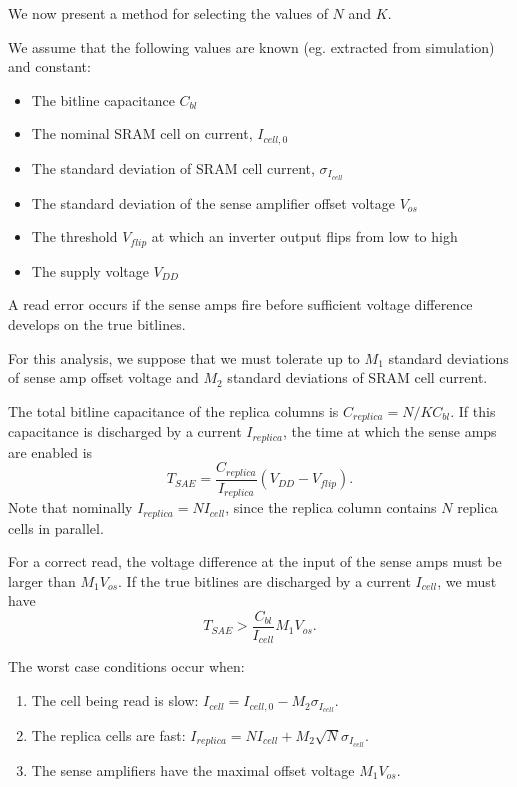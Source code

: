 We now present a method for selecting the values of $N$ and $K$.

We assume that the following values are known (eg. extracted from simulation) and constant:
\begin{itemize}
\item The bitline capacitance $C_{bl}$
\item The nominal SRAM cell on current, $I_{cell,0}$
\item The standard deviation of SRAM cell current, $\sigma_{I_{cell}}$
\item The standard deviation of the sense amplifier offset voltage $V_{os}$
\item The threshold $V_{flip}$ at which an inverter output flips from low to high
\item The supply voltage $V_{DD}$
\end{itemize}

A read error occurs if the sense amps fire before sufficient voltage difference develops on the true bitlines.

For this analysis, we suppose that we must tolerate up to $M_1$ standard deviations of sense amp offset voltage
and $M_2$ standard deviations of SRAM cell current.

The total bitline capacitance of the replica columns is $ C_{replica} = N/K C_{bl}. $
If this capacitance is discharged by a current $I_{replica}$, the time at which the sense amps are enabled is
\begin{equation}
T_{SAE} = \frac{C_{replica}}{I_{replica}}\left( V_{DD} - V_{flip} \right).
\end{equation}
Note that nominally $I_{replica} = N I_{cell}$, since the replica column contains $N$ replica cells in parallel.

For a correct read, the voltage difference at the input of the sense amps must be larger than $M_1 V_{os}.$
If the true bitlines are discharged by a current $I_{cell}$, we must have
\begin{equation}
T_{SAE} > \frac{C_{bl}}{I_{cell}} M_1 V_{os}.
\end{equation}

The worst case conditions occur when:
\begin{enumerate}
\item The cell being read is slow: $ I_{cell} = I_{cell,0} - M_2 \sigma_{I_{cell}}. $

\item The replica cells are fast: $ I_{replica} = N I_{cell} + M_2 \sqrt{N} \sigma_{I_{cell}}. $

\item The sense amplifiers have the maximal offset voltage $M_1 V_{os}$.
\end{enumerate}

